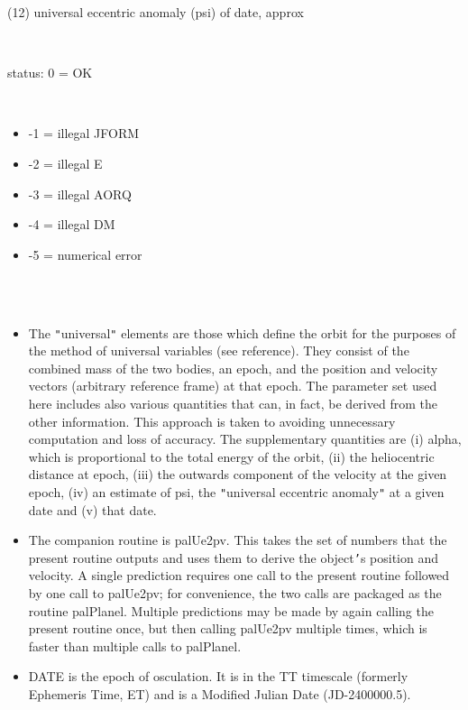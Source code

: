 \documentclass[twoside,11pt]{article}
\renewcommand{\_}{\texttt{\symbol{95}}}
\newcommand{\sstsubsection}[1]{ \item[{#1}] \mbox{} \\}
\newcommand{\sstnotes}[1]{\goodbreak \item[Notes:] \mbox{} \\[1.3ex] #1}
\newcommand{\sstitemlist}[1]{
  \mbox{} \\
  \vspace{-3.5ex}
  \begin{itemize}
     #1
  \end{itemize}
}
\newcommand{\sstitem}{\item}
\newcommand{\sstsubsection}[1]{\item[{#1}]}
\newcommand{\sstnotes}[1]{\item[Notes:] #1 }
\newcommand{\sstitemlist}[1]{
      \begin{itemize}
         #1
      \end{itemize}
      \\
   }
\newcommand{\sstitem}{\item}
\begin{document}
{{{{            \sstitem
              (12)  universal eccentric anomaly (psi) of date, approx
         }
      }
      \sstsubsection{
         jstat = int $*$ (Returned)
      }{
         status:  0 = OK
         \sstitemlist{

            \sstitem
                  -1 = illegal JFORM

            \sstitem
                  -2 = illegal E

            \sstitem
                  -3 = illegal AORQ

            \sstitem
                  -4 = illegal DM

            \sstitem
                  -5 = numerical error
         }
      }
   }
   \sstnotes{
      \sstitemlist{

         \sstitem
         The {\tt "}universal{\tt "} elements are those which define the orbit for the
           purposes of the method of universal variables (see reference).
           They consist of the combined mass of the two bodies, an epoch,
           and the position and velocity vectors (arbitrary reference frame)
           at that epoch.  The parameter set used here includes also various
           quantities that can, in fact, be derived from the other
           information.  This approach is taken to avoiding unnecessary
           computation and loss of accuracy.  The supplementary quantities
           are (i) alpha, which is proportional to the total energy of the
           orbit, (ii) the heliocentric distance at epoch, (iii) the
           outwards component of the velocity at the given epoch, (iv) an
           estimate of psi, the {\tt "}universal eccentric anomaly{\tt "} at a given
           date and (v) that date.

         \sstitem
         The companion routine is palUe2pv.  This takes the set of numbers
           that the present routine outputs and uses them to derive the
           object{\tt '}s position and velocity.  A single prediction requires one
           call to the present routine followed by one call to palUe2pv;
           for convenience, the two calls are packaged as the routine
           palPlanel.  Multiple predictions may be made by again calling the
           present routine once, but then calling palUe2pv multiple times,
           which is faster than multiple calls to palPlanel.

         \sstitem
         DATE is the epoch of osculation.  It is in the TT timescale
           (formerly Ephemeris Time, ET) and is a Modified Julian Date
           (JD-2400000.5).

}}}
\end{document}
